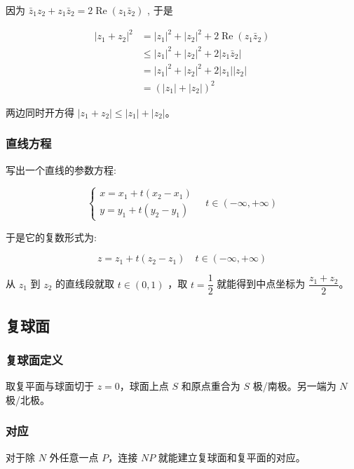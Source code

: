 因为
\(\bar{z}_{1}z_{2}+z_{1}\bar{z}_{2}=2\operatorname{Re}(z_{1}\bar{z}_{2})\)
, 于是

\begin{equation*}
\begin{aligned}
\left|z_{1}+z_{2}\right|^{2}&=\left|z_{1}\right|^{2}+\left|z_{2}\right|^{2}+2\operatorname{Re}(z_{1}\bar{z}_{2}) \\
&\leq\left|z_{1}\right|^{2}+\left|z_{2}\right|^{2}+2\left|z_{1}\bar{z}_{2}\right| \\
&=\left|z_{1}\right|^{2}+\left|z_{2}\right|^{2}+2\left|z_{1}\right|\left|z_{2}\right| \\
&=\left(\left|z_{1}\right|+\left|z_{2}\right|\right)^{2}
\end{aligned}
\end{equation*}

两边同时开方得
\(\left|z_{1}+z_{2}\right|\leq\left|z_{1}\right|+\left|z_{2}\right|\)。
\subsubsection{直线方程}
\label{直线方程}
写出一个直线的参数方程:

\begin{equation*}
\left\{
\begin{array}{l}
x = x_1 + t (x_2 - x_1) \\
y = y_1 + t (y_2 - y_1)
\end{array}
\right.
\quad t \in (-\infty, +\infty)
\end{equation*}

于是它的复数形式为:

\begin{equation*}
z=z_1+t(z_2-z_1)\quad t\in (-\infty,+\infty)
\end{equation*}

从 \(z_1\) 到 \(z_2\) 的直线段就取 \(t \in (0,1)\) ，取
\(t=\dfrac{1}{2}\) 就能得到中点坐标为 \(\dfrac{z_1+z_2}{2}\)。
\subsection{复球面}
\label{复球面}
\subsubsection{复球面定义}
\label{复球面定义}
取复平面与球面切于 \(z=0\)，球面上点 \(S\) 和原点重合为 \(S\)
极/南极。另一端为 \(N\) 极/北极。
\subsubsection{对应}
\label{对应}
对于除 \(N\) 外任意一点 \(P\)，连接 \(NP\)
就能建立复球面和复平面的对应。

